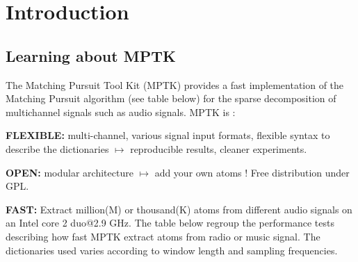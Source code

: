 \chapter{Introduction}

\section{Learning about MPTK}
	
The Matching Pursuit Tool Kit (MPTK) provides a fast implementation of the Matching Pursuit algorithm (see table below) for 
the sparse decomposition of multichannel signals such as audio signals. MPTK is :

\begin{my_itemize}
	\item \textbf{FLEXIBLE:} multi-channel, various signal input formats, flexible syntax to describe the dictionaries 
	$\mapsto$ reproducible results, cleaner experiments. 
	\item \textbf{OPEN:} modular architecture $\mapsto$ add your own atoms ! Free distribution under GPL. 
	\item \textbf{FAST:} Extract million(M) or thousand(K) atoms from different audio signals on an Intel core 2 duo@2.9 GHz. 
	The table below regroup the performance tests describing how fast MPTK extract atoms from radio or music signal. The 
	dictionaries used varies according to window length and sampling frequencies.
\end{my_itemize}


